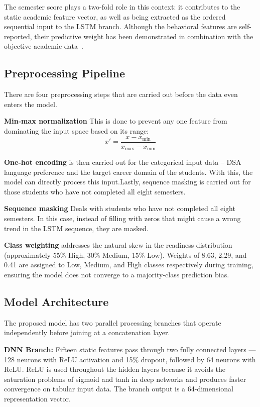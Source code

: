 \documentclass[conference]{IEEEtran}
\begin{document}
The semester score plays a two-fold role in this context: it contributes to the static academic feature vector, as well as being extracted as the ordered sequential input to the LSTM branch. Although the behavioral features are self-reported, their predictive weight has been demonstrated in combination with the objective academic data~\cite{R4}.

\subsection{Preprocessing Pipeline}

There are four preprocessing steps that are carried out before the data even enters the model. 

\textbf{Min-max normalization} This is done to prevent any one feature from dominating the input space based on its range:
\begin{equation}
x' = \frac{x - x_{\min}}{x_{\max} - x_{\min}}
\end{equation}

\textbf{One-hot encoding} is then carried out for the categorical input data – DSA language preference and the target career domain of the students. With this, the model can directly process this input.Lastly, sequence masking is carried out for those students who have not completed all eight semesters.

\textbf{Sequence masking} Deals with students who have not completed all eight semesters. In this case, instead of filling with zeros that might cause a wrong trend in the LSTM sequence, they are masked.

\textbf{Class weighting} addresses the natural skew in the readiness distribution (approximately 55\% High, 30\% Medium, 15\% Low). Weights of 8.63, 2.29, and 0.41 are assigned to Low, Medium, and High classes respectively during training, ensuring the model does not converge to a majority-class prediction bias.

\subsection{Model Architecture}

The proposed model has two parallel processing branches that operate independently before joining at a concatenation layer.

\textbf{DNN Branch:} Fifteen static features pass through two fully connected layers — 128 neurons with ReLU activation and 15\% dropout, followed by 64 neurons with ReLU. ReLU is used throughout the hidden layers because it avoids the saturation problems of sigmoid and tanh in deep networks and produces faster convergence on tabular input data. The branch output is a 64-dimensional representation vector.
\end{document}
